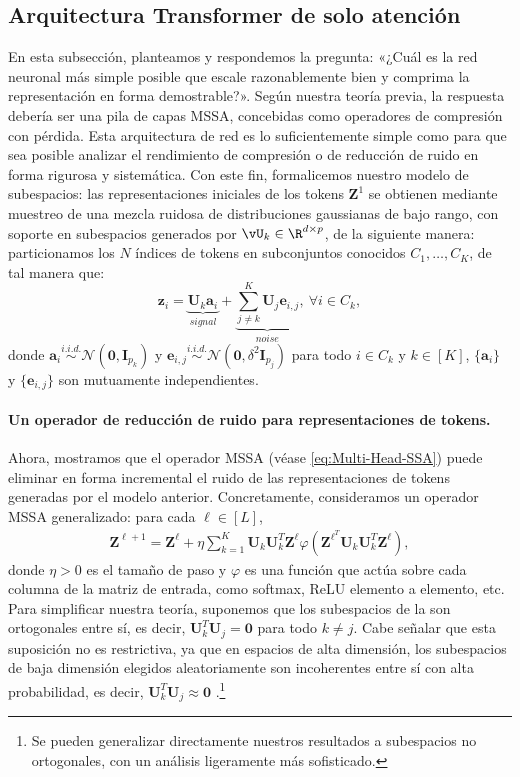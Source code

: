\documentclass[../../book-main.tex]{subfiles}
\begin{document}
\subsection{Arquitectura Transformer de solo atención} \label{sub:aot}

En esta subsección, planteamos y respondemos la pregunta: «¿Cuál es la
red neuronal más simple posible que escale razonablemente bien y
comprima la representación en forma demostrable?». Según nuestra teoría previa,
la respuesta debería ser una pila de capas MSSA, concebidas como
operadores de compresión con pérdida. Esta arquitectura de red es lo suficientemente
simple como para que sea posible analizar el rendimiento de compresión o
de reducción de ruido en forma rigurosa y sistemática. Con este
fin, formalicemos nuestro modelo de subespacios: las representaciones iniciales de los tokens
$\bm Z^{1}$ se obtienen mediante muestreo de una mezcla ruidosa de
distribuciones gaussianas de bajo rango, con soporte en subespacios generados por \(\vU_{k} \in
\R^{d \times p}\), de la siguiente manera: particionamos los \(N\) índices de tokens
en subconjuntos conocidos \(C_{1}, \dots, C_{K}\), de tal manera que:
\begin{equation}\label{def:MoG}
    \bm z_i = \underbrace{\bm U_{k} \bm a_i}_{signal} +
    \underbrace{\sum_{j \neq k}^K \bm U_j \bm e_{i,j}}_{
    noise},\ \forall i \in C_k,
\end{equation}
donde $\bm{a}_i \overset{i.i.d.}{\sim}
\mathcal{N}(\bm{0},\bm{I}_{p_k})$ y $\bm{e}_{i,j}
\overset{i.i.d.}{\sim} \mathcal{N}(\bm{0},\delta^2\bm{I}_{p_j})$
para todo $i \in C_k$ y $k \in [K]$, $\{\bm{a}_i\}$ y
$\{\bm{e}_{i,j}\}$ son mutuamente independientes.

\paragraph{Un operador de reducción de ruido para representaciones de tokens.} Ahora,
mostramos que el operador MSSA (véase \eqref{eq:Multi-Head-SSA}) puede
eliminar en forma incremental el ruido de las representaciones de tokens generadas por el
modelo anterior. Concretamente, consideramos un operador MSSA generalizado: para cada
$\ell \in [L]$,
\begin{align}\label{eq:MSSA}
    \bm Z^{\ell+1} =  \bm Z^{\ell} + \eta \sum_{k=1}^K \bm U_k\bm
    U_k^T \bm Z^{\ell} \varphi(\bm Z^{\ell^T}\bm U_k\bm
    U_k^T\bm Z^{\ell}),
\end{align}
donde $\eta > 0$ es el tamaño de paso y $\varphi$ es una función
que actúa sobre cada columna de la matriz de entrada, como softmax,
ReLU elemento a elemento, etc. Para simplificar nuestra teoría, suponemos que los
subespacios de la  son ortogonales entre sí, es decir, $\bm
U_k^T\bm U_j = \bm 0$ para todo $k \neq j$. Cabe señalar que esta suposición
no es restrictiva, ya que en espacios de alta dimensión, los subespacios 
de baja dimensión elegidos aleatoriamente son incoherentes entre sí con alta
probabilidad, es decir, $\bm U_k^T\bm U_j \approx \bm 0$
\citep{Wright-Ma-2022}.\footnote{Se pueden generalizar directamente
    nuestros resultados a subespacios no ortogonales, con un análisis ligeramente más
sofisticado.}
\end{document}
